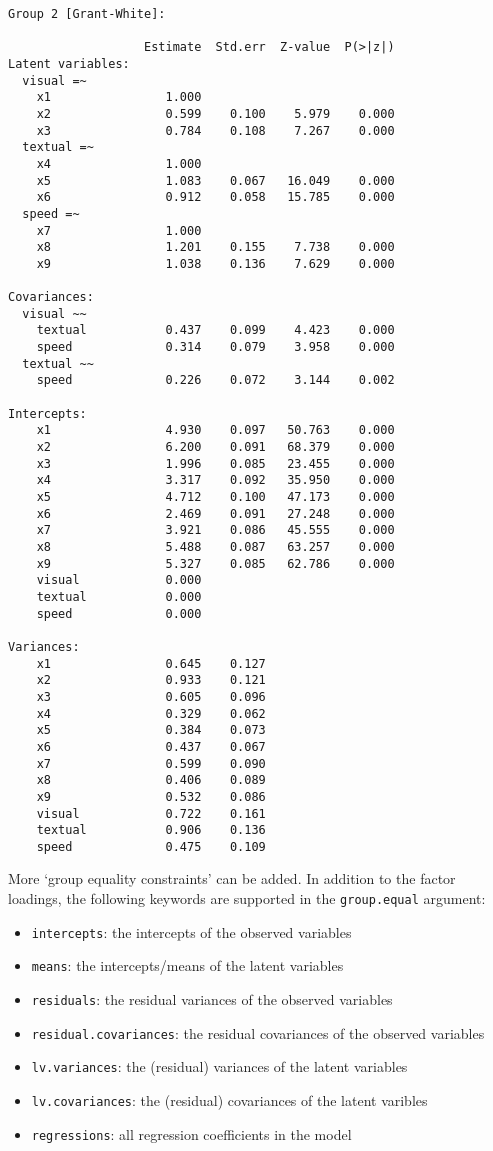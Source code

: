 \begin{verbatim}
Group 2 [Grant-White]:

                   Estimate  Std.err  Z-value  P(>|z|)
Latent variables:
  visual =~
    x1                1.000
    x2                0.599    0.100    5.979    0.000
    x3                0.784    0.108    7.267    0.000
  textual =~
    x4                1.000
    x5                1.083    0.067   16.049    0.000
    x6                0.912    0.058   15.785    0.000
  speed =~
    x7                1.000
    x8                1.201    0.155    7.738    0.000
    x9                1.038    0.136    7.629    0.000

Covariances:
  visual ~~
    textual           0.437    0.099    4.423    0.000
    speed             0.314    0.079    3.958    0.000
  textual ~~
    speed             0.226    0.072    3.144    0.002

Intercepts:
    x1                4.930    0.097   50.763    0.000
    x2                6.200    0.091   68.379    0.000
    x3                1.996    0.085   23.455    0.000
    x4                3.317    0.092   35.950    0.000
    x5                4.712    0.100   47.173    0.000
    x6                2.469    0.091   27.248    0.000
    x7                3.921    0.086   45.555    0.000
    x8                5.488    0.087   63.257    0.000
    x9                5.327    0.085   62.786    0.000
    visual            0.000
    textual           0.000
    speed             0.000

Variances:
    x1                0.645    0.127
    x2                0.933    0.121
    x3                0.605    0.096
    x4                0.329    0.062
    x5                0.384    0.073
    x6                0.437    0.067
    x7                0.599    0.090
    x8                0.406    0.089
    x9                0.532    0.086
    visual            0.722    0.161
    textual           0.906    0.136
    speed             0.475    0.109
\end{verbatim}

More `group equality constraints' can be added. In addition to the
factor loadings, the following keywords are supported in the
\texttt{group.equal} argument:

\begin{itemize}
\itemsep1pt\parskip0pt
\item
  \texttt{intercepts}: the intercepts of the observed variables
\item
  \texttt{means}: the intercepts/means of the latent variables
\item
  \texttt{residuals}: the residual variances of the observed variables
\item
  \texttt{residual.covariances}: the residual covariances of the
  observed variables
\item
  \texttt{lv.variances}: the (residual) variances of the latent
  variables
\item
  \texttt{lv.covariances}: the (residual) covariances of the latent
  varibles
\item
  \texttt{regressions}: all regression coefficients in the model
\end{itemize}


